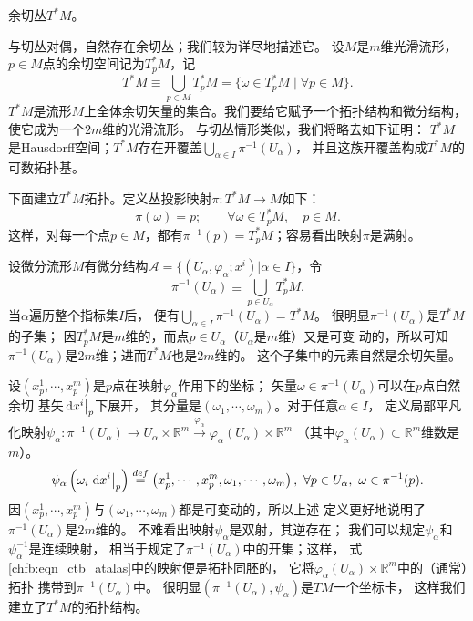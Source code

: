 \begin{example}\label{chfb:exm_ctb}
    余切丛$T^* M$。
\end{example}
与切丛对偶，自然存在余切丛；我们较为详尽地描述它。
设$M$是$m$维光滑流形，$p\in M$点的余切空间记为$T_p^* M$，记
\begin{equation}\label{chfb:eqn_cotangent-bundle-set}
    T^* M \equiv \bigcup _{p\in M} T_p^* M = \{\omega \in T_p^* M \mid \forall p\in M\} .
\end{equation}
$T^*M$是流形$M$上全体余切矢量的集合。我们要给它赋予一个拓扑结构和微分结构，使它成为一个$2m$维的光滑流形。
与切丛情形类似，我们将略去如下证明：
$T^*M$是Hausdorff空间；$T^*M$存在开覆盖$\bigcup _{\alpha\in I} \pi^{-1} (U_\alpha)$，
并且这族开覆盖构成$T^*M$的可数拓扑基。

下面建立$T^*M$拓扑。定义丛投影映射$\pi:T^*M\to M$如下：
\begin{equation*}
    \pi(\omega) = p; \qquad \forall \omega \in T_p^* M,\quad p\in M.
\end{equation*}
这样，对每一个点$p\in M$，都有$\pi^{-1}(p)=T_p^* M$；容易看出映射$\pi$是满射。

设微分流形$M$有微分结构$\mathscr{A}=\{(U_\alpha,\varphi_\alpha;x^i)|\alpha \in I \}$，令
\begin{equation*}
    \pi^{-1} (U_\alpha) \equiv \bigcup _{p\in U_\alpha} T_p^*M .
\end{equation*}
当$\alpha$遍历整个指标集$I$后，
便有$\bigcup _{\alpha \in I}  \pi^{-1} (U_\alpha) = T^*M$。
很明显$\pi^{-1} (U_\alpha)$是$T^*M$的子集；
因$T^*_pM$是$m$维的，而点$p\in U_\alpha$（$U_\alpha$是$m$维）又是可变
动的，所以可知$\pi^{-1} (U_\alpha)$是$2m$维；进而$T^*M$也是$2m$维的。
这个子集中的元素自然是余切矢量。

设$(x_p^1,\cdots,x_p^m)$是$p$点在映射$\varphi_\alpha$作用下的坐标；
矢量$\omega \in \pi^{-1} (U_\alpha)$可以在$p$点自然余切
基矢$\left.{\rm d}x^i \right | _p$下展开，
其分量是$(\omega_1,\cdots,\omega_m)$。对于任意$\alpha \in I$，
定义局部平凡化映射$\psi_\alpha: \pi^{-1} (U_\alpha) \to U_\alpha \times \mathbb{R}^m 
\overset{\varphi_\alpha}{\longrightarrow} \varphi_\alpha(U_\alpha) \times \mathbb{R}^m $
（其中$\varphi_\alpha(U_\alpha) \subset \mathbb{R}^m$维数是$m$）。
\begin{equation}\label{chfb:eqn_ctb_atalas}
    \psi_\alpha\left(\omega_i \left. {\rm d}x^i \right| _p \right) \overset{def}{=} 
    \left(x_p^1,\cdots,x_p^m, \omega_1,\cdots,\omega_m\right),
    \ \forall p\in U_\alpha,\ \omega\in \pi^{-1} (p).
\end{equation}
因$(x_p^1,\cdots,x_p^m)$与$(\omega_1,\cdots,\omega_m)$都是可变动的，所以上述
定义更好地说明了$\pi^{-1} (U_\alpha)$是$2m$维的。
不难看出映射$\psi_\alpha$是双射，其逆存在；
我们可以规定$\psi_\alpha$和$\psi_\alpha^{-1}$是连续映射，
相当于规定了$\pi^{-1} (U_\alpha)$中的开集；这样，
式\eqref{chfb:eqn_ctb_atalas}中的映射便是拓扑同胚的，
它将$\varphi_\alpha(U_\alpha) \times \mathbb{R}^m $中的（通常）拓扑
携带到$\pi^{-1} (U_\alpha)$中。
很明显$(\pi^{-1} (U_\alpha),\psi_\alpha)$是$TM$一个坐标卡，
这样我们建立了$T^*M$的拓扑结构。


